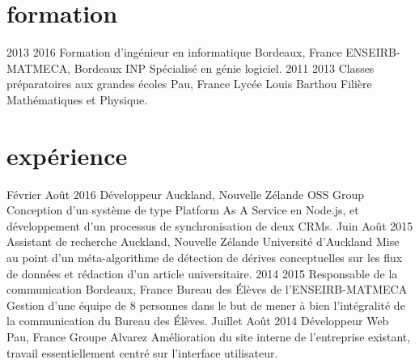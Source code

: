\section{formation}
\begin{experiencelist}
\entry
    {2013}
    {2016}
    {Formation d'ingénieur en informatique}
    {Bordeaux, France}
    {ENSEIRB-MATMECA, Bordeaux INP}
    {
        Spécialisé en génie logiciel.
    }
\entry
    {2011}
    {2013}
    {Classes préparatoires aux grandes écoles}
    {Pau, France}
    {Lycée Louis Barthou}
    {
        Filière Mathématiques et Physique.
    }
\end{experiencelist}



\section{expérience}
\begin{experiencelist}
\entry
    {Février}
    {Août 2016}
    {Développeur}
    {Auckland, Nouvelle Zélande}
    {OSS Group}
    {
        Conception d'un système de type Platform As A Service en Node.js, et
        développement d'un processus de synchronisation de deux CRMs.
    }
\entry
    {Juin}
    {Août 2015}
    {Assistant de recherche}
    {Auckland, Nouvelle Zélande}
    {Université d'Auckland}
    {
        Mise au point d'un méta-algorithme de détection de dérives conceptuelles
        sur les flux de données et rédaction d'un article universitaire.
    }
\entry
    {2014}
    {2015}
    {Responsable de la communication}
    {Bordeaux, France}
    {Bureau des Élèves de l'ENSEIRB-MATMECA}
    {
        Gestion d'une équipe de 8 personnes dans le but de mener à bien
        l'intégralité de la communication du Bureau des Élèves.
    }
\entry
    {Juillet}
    {Août 2014}
    {Développeur Web}
    {Pau, France}
    {Groupe Alvarez}
    {
        Amélioration du site interne de l'entreprise existant, travail
        essentiellement centré sur l'interface utilisateur.
    }
\end{experiencelist}



